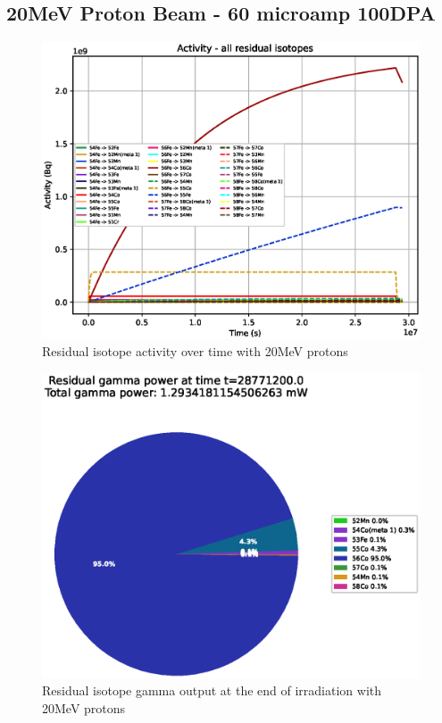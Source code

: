 \clearpage
\FloatBarrier
\subsection{20MeV Proton Beam - 60 microamp 100DPA}

\begin{figure}[!htb]
\centering
\includegraphics[width=0.7\linewidth]{chapters/activity_code/fe_100dpa/by_isotope/20MeV_all_radioactive_isotopes.eps}
\caption{Residual isotope activity over time with 20MeV protons}
\label{fig:20mev-proton-100dpa-activity}
\end{figure}

\begin{figure}[!htb]
\centering
\includegraphics[width=0.7\linewidth]{chapters/activity_code/fe_100dpa/endofbeam/20MeV_0400_28771200.eps}
\caption{Residual isotope gamma output at the end of irradiation with 20MeV protons}
\label{fig:20mev-proton-100dpa}
\end{figure}

